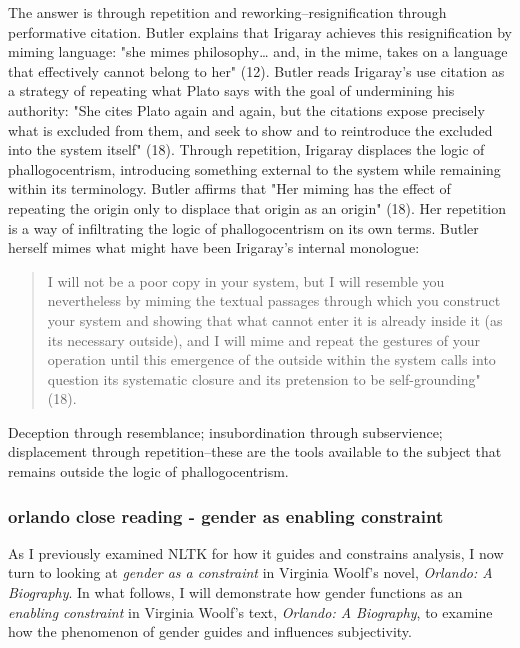 \documentclass[11pt]{article}
\begin{document}
The answer is through repetition and reworking--resignification
through performative citation. Butler explains that Irigaray achieves
this resignification by miming language: "she mimes philosophy\ldots{} and,
in the mime, takes on a language that effectively cannot belong to
her" (12). Butler reads Irigaray's use citation as a strategy of
repeating what Plato says with the goal of undermining his authority:
"She cites Plato again and again, but the citations expose precisely
what is excluded from them, and seek to show and to reintroduce the
excluded into the system itself" (18). Through repetition, Irigaray
displaces the logic of phallogocentrism, introducing something
external to the system while remaining within its terminology. Butler
affirms that "Her miming has the effect of repeating the origin only
to displace that origin as an origin" (18). Her repetition is a way of
infiltrating the logic of phallogocentrism on its own terms. Butler
herself mimes what might have been Irigaray's internal monologue:
\begin{quote}
I will not be a poor copy in your system, but I will resemble you
nevertheless by miming the textual passages through which you
construct your system and showing that what cannot enter it is already
inside it (as its necessary outside), and I will mime and repeat the
gestures of your operation until this emergence of the outside within
the system calls into question its systematic closure and its
pretension to be self-grounding" (18).
\end{quote}
Deception through resemblance; insubordination through subservience;
displacement through repetition--these are the tools available to the
subject that remains outside the logic of phallogocentrism.

\subsubsection{orlando close reading - gender as enabling constraint}
\label{sec:org8f90aaf}
As I previously examined NLTK for how it guides and constrains
analysis, I now turn to looking at \emph{gender as a constraint} in
Virginia Woolf's novel, \emph{Orlando: A Biography}. In what follows, I
will demonstrate how gender functions as an \emph{enabling constraint} in
Virginia Woolf's text, \emph{Orlando: A Biography}, to examine how the
phenomenon of gender guides and influences subjectivity.
\end{document}
